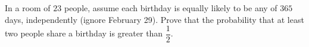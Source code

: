 In a room of $23$ people, assume each birthday is equally likely to be any of $365$ days, independently (ignore February 29). Prove that the probability that at least two people share a birthday is greater than $\dfrac{1}{2}$.
